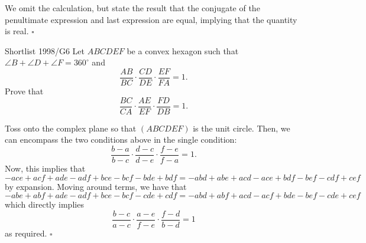 \documentclass{article}
\begin{document}
We omit the calculation, but state the result that the conjugate of the penultimate expression and last expression are equal, implying that the quantity is real. $\square$

\begin{problem}[6.45]{Shortlist 1998/G6}
Let $ABCDEF$ be a convex hexagon such that $\angle B+\angle D+\angle F=360^\circ$ and \[\frac{AB}{BC} \cdot \frac{CD}{DE} \cdot \frac{EF}{FA} = 1.\] Prove that \[\frac{BC}{CA} \cdot \frac{AE}{EF} \cdot \frac{FD}{DB} = 1.\]
\end{problem}

Toss onto the complex plane so that $(ABCDEF)$ is the unit circle. Then, we can encompass the two conditions above in the single condition: \[\dfrac{b-a}{b-c}\cdot\dfrac{d-c}{d-e}\cdot\dfrac{f-e}{f-a} = 1.\] Now, this implies that \[-ace+acf+ade-adf+bce-bcf-bde+bdf = -abd+abe+acd-ace+bdf-bef-cdf+cef\] by expansion. Moving around terms, we have that \[-abe+abf+ade-adf+bce-bcf-cde+cdf = -abd+abf+acd-acf+bde-bef-cde+cef\] which directly implies \[\dfrac{b-c}{a-c}\cdot\dfrac{a-e}{f-e}\cdot\dfrac{f-d}{b-d} = 1\] as required. $\square$
\end{document}
